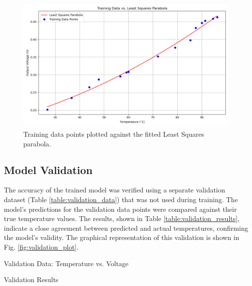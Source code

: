 \documentclass[conference]{IEEEtran}
\begin{document}
\begin{figure}[!h]
    \centering
    \includegraphics[width=0.9\columnwidth]{figs/training_data.png}
    \caption{Training data points plotted against the fitted Least Squares parabola.}
    \label{fig:training_plot}
\end{figure}

\subsection{Model Validation}
The accuracy of the trained model was verified using a separate validation dataset (Table \ref{table:validation_data}) that was not used during training. The model's predictions for the validation data points were compared against their true temperature values. The results, shown in Table \ref{table:validation_results}, indicate a close agreement between predicted and actual temperatures, confirming the model's validity. The graphical representation of this validation is shown in Fig. \ref{fig:validation_plot}.

\begin{table}[!h]
  \centering
  \caption{Validation Data: Temperature vs. Voltage}
  \label{table:validation_data}
  
\end{table}

\begin{table}[!h]
  \centering
  \caption{Validation Results}
  \label{table:validation_results}
  
\end{table}
\end{document}
